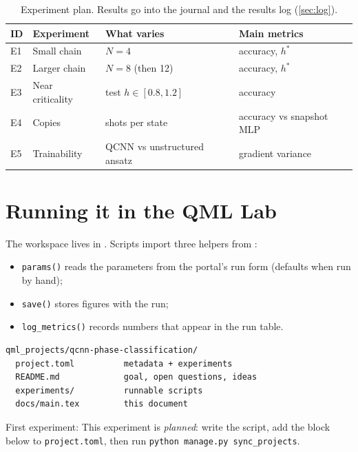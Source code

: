 \documentclass[11pt,a4paper]{article}
\begin{document}
\begin{table}[h]
\centering\small
\begin{tabularx}{\linewidth}{@{}l>{\raggedright}X>{\raggedright}X>{\raggedright\arraybackslash}X@{}}
\toprule
ID & Experiment & What varies & Main metrics \\
\midrule
  E1 & Small chain & $N=4$ & accuracy, $h^*$ \\
  E2 & Larger chain & $N=8$ (then 12) & accuracy, $h^*$ \\
  E3 & Near criticality & test $h\in[0.8,1.2]$ & accuracy \\
  E4 & Copies & shots per state & accuracy vs snapshot MLP \\
  E5 & Trainability & QCNN vs unstructured ansatz & gradient variance \\
\bottomrule
\end{tabularx}
\caption{Experiment plan. Results go into the journal and the results log (\cref{sec:log}).}
\end{table}

\section{Running it in the QML Lab}
The workspace lives in . Scripts import three helpers from
:
\begin{itemize}
  \item \texttt{params()} reads the parameters from the portal's run form (defaults when run by hand);
  \item \texttt{save()} stores figures with the run;
  \item \texttt{log\_metrics()} records numbers that appear in the run table.
\end{itemize}

\begin{lstlisting}
qml_projects/qcnn-phase-classification/
  project.toml          metadata + experiments
  README.md             goal, open questions, ideas
  experiments/          runnable scripts
  docs/main.tex         this document
\end{lstlisting}

First experiment: This experiment is \emph{planned}: write the script, add the block below to \texttt{project.toml}, then run \texttt{python manage.py sync\_projects}.
\end{document}
